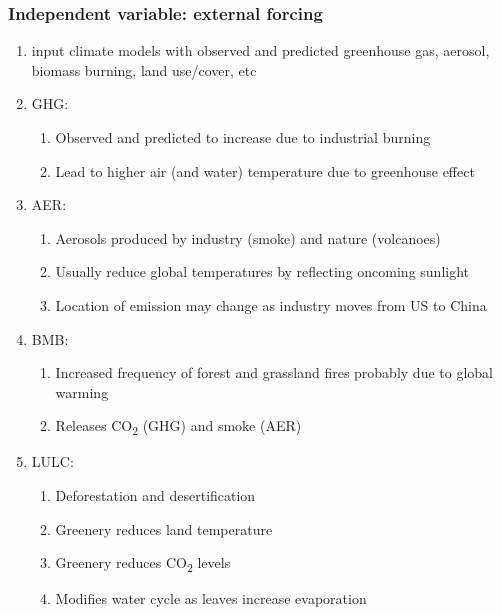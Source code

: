 \documentclass[11pt]{article}
\begin{document}
\subsubsection{Independent variable: external forcing}
\label{sec:org2e804f0}
\begin{enumerate}
\item input climate models with observed and predicted greenhouse gas, aerosol, biomass burning, land use/cover, etc
\label{sec:org72954cd}
\item GHG:
\label{sec:org5622f92}
\begin{enumerate}
\item Observed and predicted to increase due to industrial burning
\label{sec:org6a16208}
\item Lead to higher air (and water) temperature due to greenhouse effect
\label{sec:orgda4de99}
\end{enumerate}
\item AER:
\label{sec:orgf592de7}
\begin{enumerate}
\item Aerosols produced by industry (smoke) and nature (volcanoes)
\label{sec:org9b2d67f}
\item Usually reduce global temperatures by reflecting oncoming sunlight
\label{sec:orge9600f1}
\item Location of emission may change as industry moves from US to China
\label{sec:orgca63294}
\end{enumerate}
\item BMB:
\label{sec:org2a56291}
\begin{enumerate}
\item Increased frequency of forest and grassland fires probably due to global warming
\label{sec:org5a531ca}
\item Releases CO\textsubscript{2} (GHG) and smoke (AER)
\label{sec:orgfc5ba1a}
\end{enumerate}
\item LULC:
\label{sec:orgc698b75}
\begin{enumerate}
\item Deforestation and desertification
\label{sec:orgde04da2}
\item Greenery reduces land temperature
\label{sec:org231cd88}
\item Greenery reduces CO\textsubscript{2} levels
\label{sec:org6abc24d}
\item Modifies water cycle as leaves increase evaporation
\label{sec:org2ceaf22}
\end{enumerate}
\end{enumerate}
\end{document}
